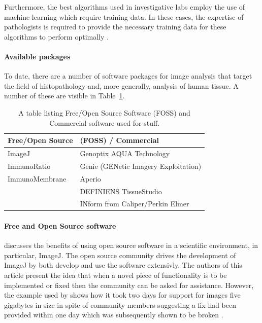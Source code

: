 \documentclass[12pt]{article}
\begin{document}
Furthermore, the best algorithms used in investigative labs employ the use of machine learning which require training 
data. In these cases, the expertise of pathologists is required to provide the necessary training data for these 
algorithms to perform optimally \parencite{webster2014whole}.

\paragraph{Available packages}
To date, there are a number of software packages for image analysis that target the field of histopathology and, more 
generally, analysis of human tissue. A number of these are visible in Table~\ref{tab:software}.

\begin{table}
\label{tab:software}
\caption{A table listing Free/Open Source Software (FOSS) and Commercial software used for stuff.}
\begin{tabular}{|  l | l |}
	\hline
	Free/Open Source & (FOSS) / Commercial \\ \hline
	ImageJ & Genoptix AQUA Technology \\
	ImmunoRatio & Genie (GENetic Imagery Exploitation) \\
	ImmunoMembrane & Aperio \\
	& DEFINIENS TissueStudio \\
	& INform from Caliper/Perkin Elmer \\ \hline
\end{tabular}

\end{table}

\paragraph{Free and Open Source software}
\citeauthor{abramoff2004image} discusses the benefits of using open source software in a scientific environment, in 
particular, ImageJ. The open source community drives the development of ImageJ by both develop and use the software extensivly. The 
authors of this article present the idea that when a novel piece of functionality is to be implemented or fixed then the 
community can be asked for assistance. However, the example used by \citeauthor{abramoff2004image} shows how 
it took two days for support for images five gigabytes in size in spite of community members suggesting a fix had been 
provided within one day which was subsequently shown to be broken \parencite{abramoff2004image}.
\end{document}
